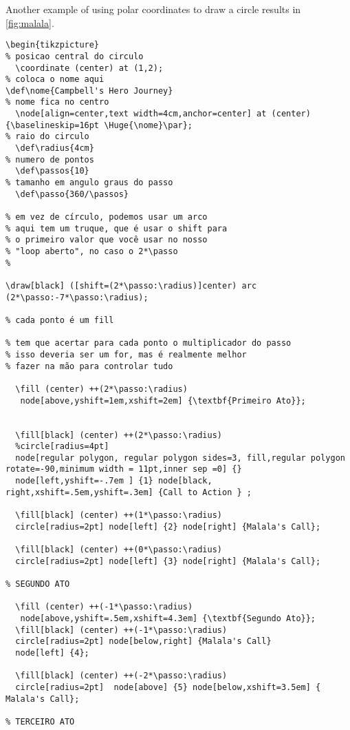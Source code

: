 Another example of using polar coordinates to draw a circle results in \autoref{fig:malala}.

\begin{verbatim}
\begin{tikzpicture}
% posicao central do circulo
  \coordinate (center) at (1,2);
% coloca o nome aqui
\def\nome{Campbell's Hero Journey}
% nome fica no centro
  \node[align=center,text width=4cm,anchor=center] at (center) {\baselineskip=16pt \Huge{\nome}\par};
% raio do circulo
  \def\radius{4cm}
% numero de pontos
  \def\passos{10}
% tamanho em angulo graus do passo
  \def\passo{360/\passos}

% em vez de círculo, podemos usar um arco
% aqui tem um truque, que é usar o shift para
% o primeiro valor que você usar no nosso
% "loop aberto", no caso o 2*\passo
% 
  
\draw[black] ([shift=(2*\passo:\radius)]center) arc (2*\passo:-7*\passo:\radius);

% cada ponto é um fill 

% tem que acertar para cada ponto o multiplicador do passo
% isso deveria ser um for, mas é realmente melhor
% fazer na mão para controlar tudo

  \fill (center) ++(2*\passo:\radius)
   node[above,yshift=1em,xshift=2em] {\textbf{Primeiro Ato}};
  

  \fill[black] (center) ++(2*\passo:\radius)
  %circle[radius=4pt] 
  node[regular polygon, regular polygon sides=3, fill,regular polygon rotate=-90,minimum width = 11pt,inner sep =0] {} 
  node[left,yshift=-.7em ] {1} node[black, right,xshift=.5em,yshift=.3em] {Call to Action } ;
  
  \fill[black] (center) ++(1*\passo:\radius)
  circle[radius=2pt] node[left] {2} node[right] {Malala's Call};
  
  \fill[black] (center) ++(0*\passo:\radius)
  circle[radius=2pt] node[left] {3} node[right] {Malala's Call};
  
% SEGUNDO ATO   
  
  \fill (center) ++(-1*\passo:\radius)
   node[above,yshift=.5em,xshift=4.3em] {\textbf{Segundo Ato}};
  \fill[black] (center) ++(-1*\passo:\radius)
  circle[radius=2pt] node[below,right] {Malala's Call}
  node[left] {4};
 
  \fill[black] (center) ++(-2*\passo:\radius)
  circle[radius=2pt]  node[above] {5} node[below,xshift=3.5em] { Malala's Call};
  
% TERCEIRO ATO  
  

\end{verbatim}
